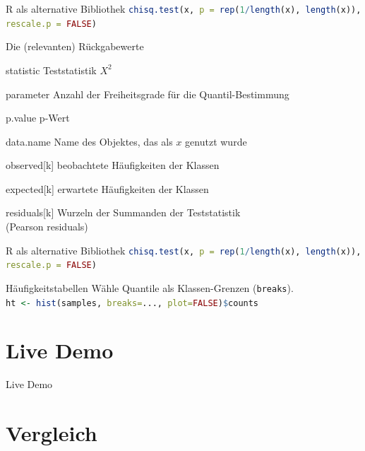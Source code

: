 \documentclass{beamer}
\begin{document}
\begin{frame}{\insertsubsection}
\begin{block}{R als alternative Bibliothek}
\lstinline[language=R]!chisq.test(x, p = rep(1/length(x), length(x)), rescale.p = FALSE)!
\end{block}
\begin{block}{Die (relevanten) Rückgabewerte}
\begin{description}[residuals{[k]}]
	\item[statistic] Teststatistik $X^2$
	\item[parameter] Anzahl der Freiheitsgrade für die Quantil-Bestimmung
	\item[p.value] p-Wert
	\item[data.name] Name des Objektes, das als $x$ genutzt wurde
	\item[observed{[k]}] beobachtete Häufigkeiten der Klassen
	\item[expected{[k]}] erwartete Häufigkeiten der Klassen
	\item[residuals{[k]}] Wurzeln der Summanden der Teststatistik \\ (Pearson residuals)
\end{description}
\end{block}
\end{frame}

\begin{frame}[fragile]{\insertsubsection}
\begin{block}{R als alternative Bibliothek}
\lstinline[language=R]!chisq.test(x, p = rep(1/length(x), length(x)), rescale.p = FALSE)!
\end{block}
\begin{block}{Häufigkeitstabellen}
	Wähle  Quantile als Klassen-Grenzen (\lstinline[language=R]!breaks!).
	\\
	\lstinline[language=R]!ht <- hist(samples, breaks=..., plot=FALSE)$counts!
\end{block}
\end{frame}

\section{Live Demo}

\begin{frame}{\insertsection}
\center
\Huge Live Demo
\end{frame}

\section{Vergleich}
\end{document}
